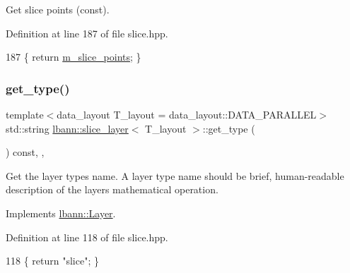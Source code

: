 Get slice points (const). 

Definition at line 187 of file slice.\+hpp.


\begin{DoxyCode}
187 \{ \textcolor{keywordflow}{return} \hyperlink{classlbann_1_1slice__layer_af79dab13a70da2e81209e7ae15166e30}{m\_slice\_points}; \}
\end{DoxyCode}
\mbox{\label{classlbann_1_1slice__layer_aa7c27032d75d8e0d36a76b0763c4f215}} 
\subsubsection{\texorpdfstring{get\+\_\+type()}{get\_type()}}
{\footnotesize\ttfamily template$<$data\+\_\+layout T\+\_\+layout = data\+\_\+layout\+::\+D\+A\+T\+A\+\_\+\+P\+A\+R\+A\+L\+L\+EL$>$ \\
std\+::string \hyperlink{classlbann_1_1slice__layer}{lbann\+::slice\+\_\+layer}$<$ T\+\_\+layout $>$\+::get\+\_\+type (\begin{DoxyParamCaption}{ }\end{DoxyParamCaption}) const\hspace{0.3cm}{\ttfamily [inline]}, {\ttfamily [override]}, {\ttfamily [virtual]}}

Get the layer type\textquotesingle{}s name. A layer type name should be brief, human-\/readable description of the layer\textquotesingle{}s mathematical operation. 

Implements \hyperlink{classlbann_1_1Layer_a0fa0ea9160b490c151c0a17fde4f7239}{lbann\+::\+Layer}.



Definition at line 118 of file slice.\+hpp.


\begin{DoxyCode}
118 \{ \textcolor{keywordflow}{return} \textcolor{stringliteral}{"slice"}; \}
\end{DoxyCode}
\mbox{\label{classlbann_1_1slice__layer_a24fb9ce808d587210faa4e3b34dc1aff}} 
